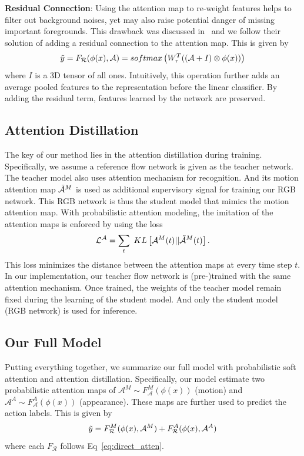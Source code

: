 \documentclass[10pt,twocolumn,letterpaper]{article}
\begin{document}
\noindent \textbf{Residual Connection}: Using the attention map to re-weight features helps to filter out background noises, yet may also raise potential danger of missing important foregrounds. This drawback was discussed in~\cite{wang2017residual} and we follow their solution of adding a residual connection to the attention map. This is given by 
\begin{equation}
\label{eq:res_atten}
\small
    \Tilde{y} = F_{\mathcal{R}}(\phi(x), \mathcal{A}) = softmax\left( W_r^T ( (\mathcal{A}+I) \otimes \phi(x) ) \right)
\end{equation}
where $I$ is a 3D tensor of all ones. Intuitively, this operation further adds an average pooled features to the representation before the linear classifier. By adding the residual term, features learned by the network are preserved. 

\subsection{Attention Distillation}
The key of our method lies in the attention distillation during training. Specifically, we assume a reference flow network is given as the teacher network. The teacher model also uses attention mechanism for recognition. And its motion attention map $\mathcal{\Tilde{A}}^M$ is used as additional supervisory signal for training our RGB network. This RGB network is thus the student model that mimics the motion attention map. With probabilistic attention modeling, the imitation of the attention maps is enforced by using the loss
\begin{equation}
\label{eq:distill}
\small 
    \mathcal{L}^{\mathcal{A}} = \sum_t\  KL\left[ \mathcal{A}^M(t)||\mathcal{\Tilde{A}}^M(t) \right].
\end{equation}
This loss minimizes the distance between the attention maps at every time step $t$. In our implementation, our teacher flow network is (pre-)trained with the same attention mechanism. Once trained, the weights of the teacher model remain fixed during the learning of the student model. And only the student model (RGB network) is used for inference. 

\subsection{Our Full Model}
Putting everything together, we summarize our full model with probabilistic soft attention and attention distillation. Specifically, our model estimate two probabilistic attention maps of $\mathcal{A}^M \sim F_{\mathcal{A}}^M(\phi(x))$ (motion) and $\mathcal{A}^A \sim F_{\mathcal{A}}^A(\phi(x))$ (appearance). These maps are further used to predict the action labels. This is given by 
\begin{equation}
\small
    \Tilde{y} = F_{\mathcal{R}}^M(\phi(x), \mathcal{A}^M) + F_{\mathcal{R}}^A(\phi(x), \mathcal{A}^A)
\end{equation}
where each $F_{\mathcal{R}}$ follows Eq~\ref{eq:direct_atten}.
\end{document}
